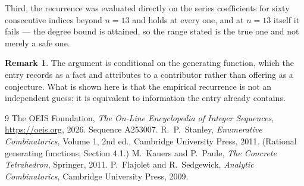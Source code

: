 \documentclass[11pt,a4paper]{article}
\theoremstyle{plain}
\theoremstyle{definition}
\newtheorem{remark}[theorem]{Remark}
\begin{document}
Third, the recurrence was evaluated directly on the series coefficients for sixty consecutive
indices beyond $n=13$ and holds at every one, and at $n=13$ itself it fails --- the
degree bound is attained, so the range stated is the true one and not merely a safe one.

\begin{remark}
The argument is conditional on the generating function, which the entry records as a fact and
attributes to a contributor rather than offering as a conjecture. What is shown here is that
the empirical recurrence is not an independent guess: it is equivalent to information the
entry already contains.
\end{remark}

\begin{thebibliography}{9}
 The OEIS Foundation, \emph{The On-Line Encyclopedia of Integer
Sequences}, \url{https://oeis.org}, 2026. Sequence A253007.
 R.~P.~Stanley, \emph{Enumerative Combinatorics}, Volume 1, 2nd ed.,
Cambridge University Press, 2011. (Rational generating functions, Section 4.1.)
 M.~Kauers and P.~Paule, \emph{The Concrete Tetrahedron}, Springer, 2011.
 P.~Flajolet and R.~Sedgewick, \emph{Analytic Combinatorics}, Cambridge
University Press, 2009.
\end{thebibliography}
\end{document}
